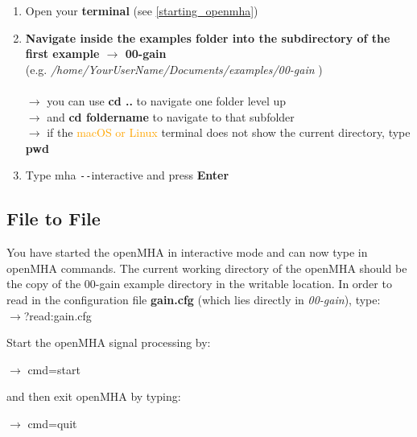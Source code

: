 \documentclass[11pt,a4paper,twoside]{article}
\newcommand{\+}{\discretionary{\mbox{\scriptsize$\hookleftarrow$}}{}{}}
\begin{document}
{{\begin{enumerate}
    
    \item Open your \textbf{terminal} (see \ref{starting_openmha})
    \item \textbf{Navigate inside the examples folder into the subdirectory of the first example $\rightarrow$ \textbf{00-gain}} \\ (e.g. \textit{/home/YourUserName/Documents/examples/00-gain} )\\ \\
    $\rightarrow$ you can use \textbf{cd ..} to navigate one folder level up \\
    $\rightarrow$ and \textbf{cd foldername} to navigate to that subfolder \\
    $\rightarrow$ if the \textcolor{orange}{macOS or Linux} terminal does not show the current directory, type \textbf{pwd} \\
    \item Type {{\ttfamily mha \texttt{-{}-}interactive}} and press \textbf{Enter}
\end{enumerate}

\subsection{File to File}

You have started the openMHA in interactive mode and can now type in openMHA commands.
The current working directory of the openMHA should be the copy of the 00-gain example directory in the writable location.
In order to read in the configuration file \textbf{gain.cfg} (which lies directly in \textit{00-gain}), type: \\

$\rightarrow${\ttfamily ?read:gain.cfg}


Start the openMHA signal processing by:

$\rightarrow$ {\ttfamily cmd=start}

and then exit openMHA by typing:

$\rightarrow$ {\ttfamily cmd=quit} 
\\

}}
\end{document}
